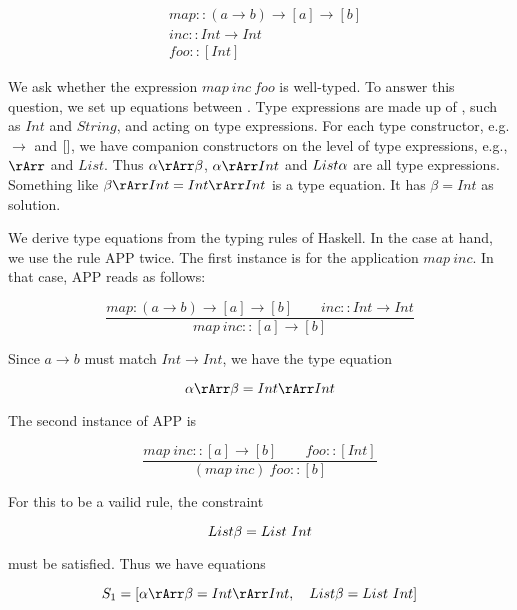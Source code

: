 \begin{align}
& map :: (a \to b) \to [a] \to [b] \\
& inc :: Int \to Int \\
& foo :: [Int]
\end{align}

We ask whether the expression $map\ inc\ foo$ is well-typed.  To answer this question, we set up equations between  .  Type expressions are made up of ,  such as $Int$ and $String$, and  acting on type expressions.  For each type constructor, e.g. $\to$ and $[\space]$, we have companion constructors on the level of type expressions, e.g., $\rArr$ and $List$.  Thus $\alpha \rArr \beta$, $\alpha \rArr Int$ and $List\space \alpha$  are all type expressions.  Something like $\beta \rArr Int = Int \rArr Int$ is a type equation.  It has $\beta = Int$ as solution.

We derive type equations from the typing rules of Haskell.  In the case at hand, we use the rule APP twice.  The first instance is for the application $map\ inc$.  In that case, APP reads as follows:

\begin{equation}
\frac{map : (a \to b) \to [a] \to [b] \qquad inc :: Int \to Int }{map\ inc :: [a] \to [b]}
\end{equation}

Since $a \to b$ must match $Int \to Int$, we have the type equation

\begin{equation}
\alpha \rArr \beta = Int \rArr Int
\end{equation}

The second instance of APP is 

\begin{equation}
\frac{map\ inc :: [a] \to [b] \qquad foo :: [Int]}{(map\ inc)\ foo :: [b]}
\end{equation}

For this to be a vailid rule, the constraint 

\begin{equation}
List\space \beta = List\ Int
\end{equation}


 must be satisfied.  Thus we have equations

\begin{equation}
S_1 = [\alpha \rArr \beta = Int \rArr Int, \quad List\space \beta = List\ Int]
\end{equation}

